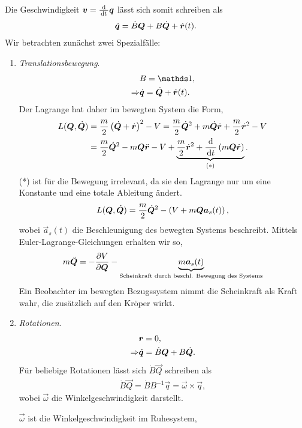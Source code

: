 Die Geschwindigkeit $\bm{v} = \frac{\mathrm{d}}{\,\mathrm{d} t\,}\bm{q}$ lässt
sich somit schreiben als
\begin{align*}
\dot{\bm{q}} = \dot{B}\bm{Q} + B\dot{\bm{Q}} + \dot{\bm{r}}(t).
\end{align*}
Wir betrachten zunächst zwei Spezialfälle:
\begin{enumerate}[label=\arabic{*})]
  \item \textit{Translationsbewegung}.
\begin{align*}
&B = \Id,\\
\Rightarrow & \dvec{q} = \dvec{Q} + \dvec{r}(t).
\end{align*}
Der Lagrange hat daher im bewegten System die Form,
\begin{align*}
L(\bm{Q},\dot{\bm{Q}}) &= \frac{m}{2}\left(\dot{\bm{Q}}+\dot{\bm{r}}\right)^2 - V =
\frac{m}{2}\dot{\bm{Q}}^2 + m\dot{\bm{Q}}\dot{\bm{r}} + \frac{m}{2}\dot{\bm{r}}^2-V\\
&= \frac{m}{2}\dot{\bm{Q}}^2 - m\bm{Q}\ddot{\bm{r}} - V +
\underbrace{\frac{m}{2}\dot{\bm{r}}^2 +
\frac{\mathrm{d}}{\,\mathrm{d} t\,}\left(m\bm{Q}\dot{\bm{r}}\right)}_{(*)}.
\end{align*}
(*) ist für die Bewegung irrelevant, da sie den Lagrange nur um eine Konstante
und eine totale Ableitung ändert.
\begin{align*}
L(\bm{Q},\dot{\bm{Q}}) = \frac{m}{2}\dot{\bm{Q}}^2 -
\left(V+m\bm{Q}\bm{a}_s(t)\right),
\end{align*}
wobei $\vec{a}_s(t)$ die Beschleunigung des bewegten Systems beschreibt.
Mittels Euler-Lagrange-Gleichungen erhalten wir so,
\begin{align*}
m\ddot{\bm{Q}} = -\frac{\partial V}{\partial \bm{Q}} -
\underbrace{m\bm{a}_s(t)}_{\text{Scheinkraft durch beschl. Bewegung des
Systems}}
\end{align*}
Ein Beobachter im bewegten Bezugssystem nimmt die Scheinkraft als Kraft wahr,
die zusätzlich auf den Kröper wirkt.
\item \textit{Rotationen}.
\begin{align*}
&\bm{r} = 0,\\
\Rightarrow & \dot{\bm{q}} = \dot{B}\bm{Q} + B\dot{\bm{Q}}.
\end{align*}
Für beliebige Rotationen lässt sich $\dot{B}\vec{Q}$ schreiben als
\begin{align*}
\dot{B}\vec{Q} = \dot{B}B^{-1}\vec{q} = \vec{\omega}\times\vec{q},\tag{**}
\end{align*}
wobei $\vec{\omega}$ die Winkelgeschwindigkeit darstellt.
\begin{bemn}
$\vec{\omega}$ ist die Winkelgeschwindigkeit im Ruhesystem,

\end{bemn}
\end{enumerate}
